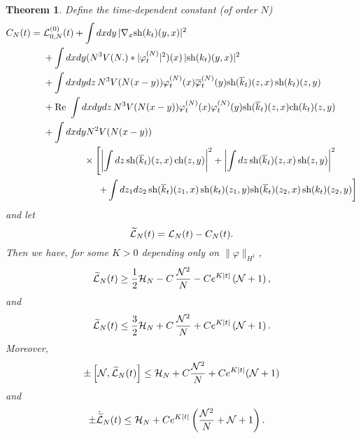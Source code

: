 \documentclass[11pt,a4paper]{article}
\newtheorem{thm}{Theorem}[section]  %
\newcommand{\ech}[2]{#2}	%
\newcommand{\ekt}{e^{K\lvert t\rvert}}	%
\newcommand{\wt}{\widetilde}
\newcommand{\cH}{{\cal H}}
\newcommand{\cL}{{\cal L}}
\newcommand{\cN}{{\cal N}}
\newcommand{\Ncal}{\mathcal{N}}		%
\newcommand{\norm}[1]{\lVert#1\rVert}	%
\begin{document}
\begin{thm}\label{thm:L}
Define the time-dependent constant (of order $N$)
\begin{equation}\label{eq:CNt} \begin{split} 
C_N (t) = \; &\cL^{(0)}_{0,N} (t) + \int dx dy \, |\nabla_x \text{sh} (k_t) (y,x)|^2  \\
 &+  \int dx dy (N^3 V(N.) * |\varphi_t^{(N)}|^2) (x) \, |\text{sh} (k_t) (y,x)|^2 \\
 &+ \int dx dy dz \, N^3 V(N (x-y)) \varphi_t^{(N)} (x) \overline{\varphi}_t^{(N)} (y) \text{sh} (\overline{k}_t) (z,x)  \, \text{sh} (k_t) (z,y)  \\
 &+ \text{Re } \int dx dy dz \, N^3 V(N (x-y)) \varphi_t^{(N)} (x) \varphi_t^{(N)} (y) \text{sh} (\overline{k}_t) (z,x) \text{ch} (k_t) (z,y)  \\
&+ \int dx dy N^2 V(N (x-y)) \\ &\hspace{1.5cm}  \times \left[ \left|\int dz \, \text{sh} (\overline{k}_t) (z,x) \, \text{ch} (z,y) \right|^2  + \left| \int dz \, \text{sh} (\overline{k}_t) (z,x) \, \text{sh} (z,y) \right|^2 \right. \\ &\hspace{2cm}  \left. 
+  \int dz_1 dz_2 \, \text{sh} (\overline{k}_t) (z_1,x) \, \text{sh} (k_t) (z_1,y)  \text{sh} (\overline{k}_t) (z_2,x) \, \text{sh} (k_t) (z_2,y) \right] 
\end{split} \end{equation}
and let
\begin{equation}\label{eq:wtcL} \wt{\cL}_N (t) = \cL_N (t) - C_N (t). \end{equation}
Then we have, for some $K > 0$ depending only on $\norm{\varphi}_{H^1}$,
\begin{equation}\label{eq:thmL-1} \wt{\cL}_N (t) \geq \frac{1}{2} \cH_N - C \, \frac{\cN^2}{N}  - C \ech{\| \varphi_t^{(N)} \|_{H^2}^2}{\ekt}  \left(\cN + 1\right), \end{equation}
and
\begin{equation}\label{eq:thmL-1b} \wt{\cL}_N (t) \leq \frac{3}{2} \cH_N + C \, \frac{\cN^2}{N}  +  C \ech{\| \varphi_t^{(N)} \|_{H^2}^2}{\ekt}  \left(\cN + 1\right). \end{equation}
Moreover, 
\begin{equation}\label{eq:thmL-2} \pm \left[ \cN , \wt{\cL}_N (t) \right]  \leq \cH_N + C \frac{\cN^2}{N} + C \ech{\| \varphi_t^{(N)} \|_{H^2}^2}{\ekt} (\cN+1) \end{equation}
and 
\begin{equation}\label{eq:thmL-3}
\begin{split} 
\pm \dot{\wt{\cL}}_N (t)  \leq \; &\cH_N + \ech{C \| \varphi_t^{(N)} \|_{H^4}^2 \, \frac{\cN^2}{N}  \\ &+ C \left( \| \varphi_t^{(N)} \|_{H^4}  \| \varphi_t^{(N)} \|_{H^2} + \| \varphi_t^{(N)} \|_{H^2}^3 \right) \left(\cN+1 \right)}{C \ekt \left(\frac{\Ncal^2}{N} + \Ncal + 1 \right)}.  
\end{split}
\end{equation}
\end{thm}
\end{document}
